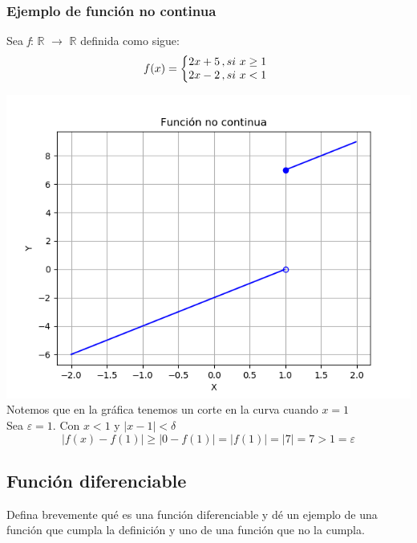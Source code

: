 \documentclass[12pt, letterpaper]{article}
\begin{document}
\subsubsection{Ejemplo de funci\'on no continua}
Sea \textit{f}: $\mathbb{R}$ $\rightarrow$ $\mathbb{R}$ definida como sigue: \\
 \[
  f(x) = \left\{
     \begin{array}{@{}l@{\thinspace}l}
       \text{$2x+5$}  &,si \text{ $x\ge1$}\\
       \text{$2x-2$} &,si \text{ $x<1$}\\
    

     \end{array}
   \right.
\]

\includegraphics[scale=0.8]{funnotcontinous} \\
Notemos que en la gr\'afica tenemos un corte en la curva cuando $x=1$\\
Sea $\varepsilon=1$. Con $x<1$ y $|x-1|<\delta$\\
 \[
 |f(x)-f(1)|\ge |0-f(1)|=|f(1)|=|7|=7>1=\varepsilon
 \]
\subsection{Funci\'on diferenciable}	
Defina brevemente qu\'e es una funci\'on diferenciable y d\'e un ejemplo de una
funci\'on que cumpla la definici\'on y uno de una funci\'on que no la cumpla.
\end{document}
